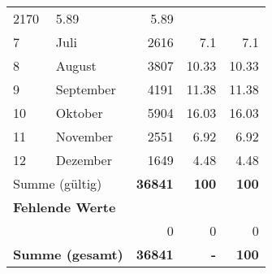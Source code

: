 \begin{longtable}{lXrrr}
       \num{2170} &
       \num[round-mode=places,round-precision=2]{5,89} &
         \num[round-mode=places,round-precision=2]{5,89} \\

     7 &
     \multicolumn{1}{X}{ Juli   } &


       \num{2616} &
       \num[round-mode=places,round-precision=2]{7,1} &
         \num[round-mode=places,round-precision=2]{7,1} \\

     8 &
     \multicolumn{1}{X}{ August   } &


       \num{3807} &
       \num[round-mode=places,round-precision=2]{10,33} &
         \num[round-mode=places,round-precision=2]{10,33} \\

     9 &
     \multicolumn{1}{X}{ September   } &


       \num{4191} &
       \num[round-mode=places,round-precision=2]{11,38} &
         \num[round-mode=places,round-precision=2]{11,38} \\

     10 &
     \multicolumn{1}{X}{ Oktober   } &


       \num{5904} &
       \num[round-mode=places,round-precision=2]{16,03} &
         \num[round-mode=places,round-precision=2]{16,03} \\

     11 &
     \multicolumn{1}{X}{ November   } &


       \num{2551} &
       \num[round-mode=places,round-precision=2]{6,92} &
         \num[round-mode=places,round-precision=2]{6,92} \\

     12 &
     \multicolumn{1}{X}{ Dezember   } &


       \num{1649} &
       \num[round-mode=places,round-precision=2]{4,48} &
         \num[round-mode=places,round-precision=2]{4,48} \\
     \midrule
     \multicolumn{2}{l}{Summe (gültig)} &
       \textbf{\num{36841}} &
     \textbf{100} &
       \textbf{\num[round-mode=places,round-precision=2]{100}} \\
     \multicolumn{5}{l}{\textbf{Fehlende Werte}}\\
      & & 0 & 0 & 0 \\
     \midrule
     \multicolumn{2}{l}{\textbf{Summe (gesamt)}} &
          \textbf{\num{36841}} &
        \textbf{-} &
        \textbf{100} \\
     \bottomrule
     \end{longtable}
     
